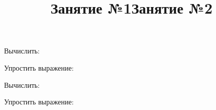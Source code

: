 \title{Занятие №1}
\begin{listofex}
	\item {}
	\item {}
	\item {}
	\item {}
	\item {}
	\item Вычислить:
	\begin{enumcols}[itemcolumns=3]
		\item {}
		\item {}
		\item {}
	\end{enumcols}
	
	\item {}
	\item {}
	\item {}
	\item {}
	\item {}
	\item Упростить выражение:
	\begin{enumcols}[itemcolumns=2]
		\item {}
		\item {}
	\end{enumcols}
\end{listofex}
\newpage
\title{Занятие №2}
\begin{listofex}
	\item {}
	\item {}
	\item {}
	\item {}
	\item {}
	\item Вычислить:
	\begin{enumcols}[itemcolumns=3]
		\item {}
		\item {}
		\item {}
	\end{enumcols}
	\item {}
	\item {}
	\item {}
	\item {} 
	\item {}
	\item Упростить выражение:
	\begin{enumcols}[itemcolumns=2]
		\item {}
		\item {}
	\end{enumcols}
	\item {}
\end{listofex}
